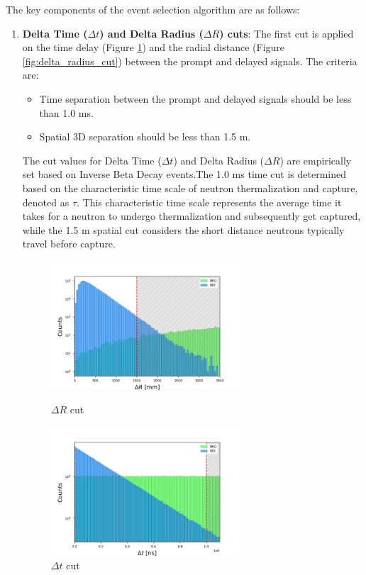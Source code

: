 The key components of the event selection algorithm are as follows:

\begin{enumerate}
	\item \textbf{Delta Time ($\Delta t$) and Delta Radius ($\Delta R$) cuts}: The first cut is applied on the time delay (Figure \ref{fig:delta_t_cut}) and the radial distance (Figure \ref{fig:delta_radius_cut}) between the prompt and delayed signals. The criteria are:
	\begin{itemize}
		\item Time separation between the prompt and delayed signals should be less than 1.0 ms.
		\item Spatial 3D separation should be less than 1.5 m.
	\end{itemize}

	The cut values for Delta Time (\(\Delta t\)) and Delta Radius (\(\Delta R\)) are empirically set based on Inverse Beta Decay events.The 1.0 ms time cut is determined based on the characteristic time scale of neutron thermalization and capture, denoted as $\tau$. This characteristic time scale represents the average time it takes for a neutron to undergo thermalization and subsequently get captured, while the 1.5 m spatial cut considers the short distance neutrons typically travel before capture.

\begin{figure}[h!]
	\centering
	\begin{minipage}{0.5\textwidth}
		\centering
		\includegraphics[width=7cm]{Images/Cut/delta_radius.png}
		\caption{$\Delta R$ cut}
		\label{fig:delta_radius_cut}
	\end{minipage}%
	\begin{minipage}{0.5\textwidth}
		\centering
		\includegraphics[width=7cm]{Images/Cut/delta_time.png}
		\caption{$\Delta t$ cut}
		\label{fig:delta_t_cut}
	\end{minipage}
\end{figure}



\end{enumerate}
